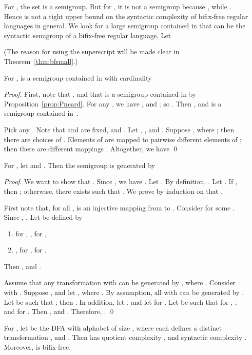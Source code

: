 \documentclass{llncs}
\newcommand{\be}{\begin{enumerate}}
\newcommand{\ee}{\end{enumerate}}
\begin{document}
For , the set  is a semigroup. But for , it is not a semigroup because ,  while . Hence  is not a tight upper bound on the syntactic complexity of bifix-free regular languages in general. We look for a large semigroup contained in  that can be the syntactic semigroup of a bifix-free regular language. Let 

(The reason for using the superscript  will be made clear in Theorem~\ref{thm:bfsmall}.) 


\begin{proposition}\label{prop:Vncard}
For ,  is a semigroup contained in  with cardinality

\end{proposition}


\begin{proof}
First, note that , and that  is a semigroup contained in  by Proposition~\ref{prop:Pncard}. For any , we have , and ; so . Then , and  is a semigroup contained in~. 

Pick any . Note that  and  are fixed, and . Let , , and . Suppose , where ; then there are  choices of . Elements of  are mapped to pairwise different elements of ; then there are  different mappings . Altogether, we have
 \qed
\end{proof}

\begin{proposition}\label{prop:bfgen}
For , let  and . Then the semigroup  is 
generated by

\end{proposition}

\begin{proof}\label{proof:bfgen}
We want to show that . Since , we have . 
Let . By definition, . Let . If , then ; 
otherwise,  there exists  such that . We prove by induction on  that . 


First note that, for all ,  is an injective mapping from  to . Consider   for some . 
Since , . Let  be defined by
\be
\item  for , ,  for , 
\item ,  for ,  for . 
\ee
Then , and .
\goodbreak

Assume that any transformation  with  can be generated by , where . 
Consider  with . 
Suppose , and let , where . 
By assumption, all  with  can be generated by . 
Let  be such that ; then . In addition, let , and let  for . Let  be such that  for , , and  for . Then , and .
Therefore, . \qed
\end{proof}

\begin{theorem}\label{thm:bfaut}
For , let  be the DFA 
with alphabet  of size , where each  defines a distinct transformation , and . 
Then  has quotient complexity , and syntactic complexity . 
Moreover,  is bifix-free.
\end{theorem}
\end{document}
